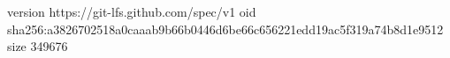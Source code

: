 version https://git-lfs.github.com/spec/v1
oid sha256:a3826702518a0caaab9b66b0446d6be66c656221edd19ac5f319a74b8d1e9512
size 349676
